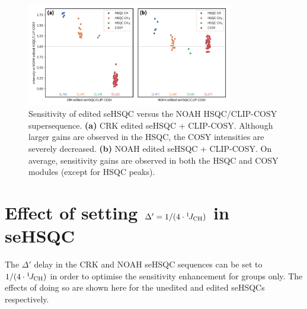\begin{figure}
    \centering
    \includegraphics[width=0.8\textwidth]{./figures/edited_sn_comp.png}
    \caption{
        Sensitivity of edited seHSQC versus the NOAH HSQC/CLIP-COSY supersequence.
        \andro{}
        \textbf{(a)} CRK edited seHSQC + CLIP-COSY.
        Although larger gains are observed in the HSQC, the COSY intensities are severely decreased.
        \textbf{(b)} NOAH edited seHSQC + CLIP-COSY.
        On average, sensitivity gains are observed in both the HSQC and COSY modules (except for HSQC  peaks).
    }
    \label{fig:edited_sn_comp}
\end{figure}

\section{Effect of setting \texorpdfstring{$\Delta' = 1/(4\cdot\onejch)$}{Delta' = 1/(4*1JCH)} in seHSQC}

The $\Delta'$ delay in the CRK and NOAH seHSQC sequences can be set to $1/(4\cdot\onejch)$ in order to optimise the sensitivity enhancement for  groups only.
The effects of doing so are shown here for the unedited and edited seHSQCs respectively.

